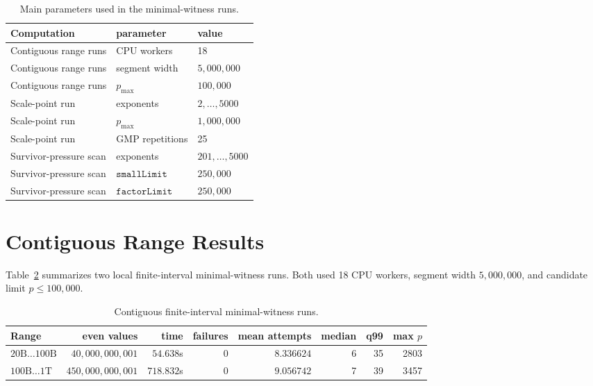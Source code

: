 \documentclass[11pt]{article}
\begin{document}
\begin{table}[!htbp]
\centering
\caption{Main parameters used in the minimal-witness runs.}
\label{tab:parameters}
\begin{tabular}{lll}
\toprule
Computation & parameter & value \\
\midrule
Contiguous range runs & CPU workers & 18 \\
Contiguous range runs & segment width & \(5{,}000{,}000\) \\
Contiguous range runs & \(p_{\max}\) & \(100{,}000\) \\
Scale-point run & exponents & \(2,\ldots,5000\) \\
Scale-point run & \(p_{\max}\) & \(1{,}000{,}000\) \\
Scale-point run & GMP repetitions & 25 \\
Survivor-pressure scan & exponents & \(201,\ldots,5000\) \\
Survivor-pressure scan & \(\texttt{smallLimit}\) & \(250{,}000\) \\
Survivor-pressure scan & \(\texttt{factorLimit}\) & \(250{,}000\) \\
\bottomrule
\end{tabular}
\end{table}

\section{Contiguous Range Results}

Table~\ref{tab:range} summarizes two local finite-interval minimal-witness
runs. Both used 18 CPU workers, segment width \(5{,}000{,}000\), and candidate
limit \(p\le100{,}000\).

\begin{table}[!htbp]
\centering
\caption{Contiguous finite-interval minimal-witness runs.}
\label{tab:range}
\begin{tabular}{lrrrrrrr}
\toprule
Range & even values & time & failures & mean attempts & median & q99 & max \(p\) \\
\midrule
\(20\mathrm{B}\ldots100\mathrm{B}\) & \(40{,}000{,}000{,}001\) & \(54.638\)s & 0 & \(8.336624\) & 6 & 35 & 2803 \\
\(100\mathrm{B}\ldots1\mathrm{T}\) & \(450{,}000{,}000{,}001\) & \(718.832\)s & 0 & \(9.056742\) & 7 & 39 & 3457 \\
\bottomrule
\end{tabular}
\end{table}
\end{document}
